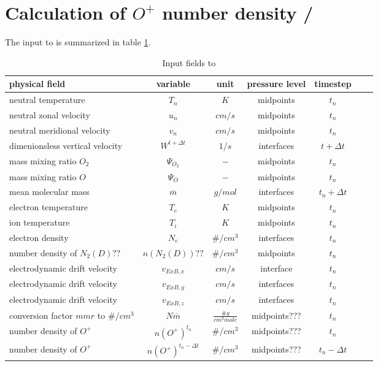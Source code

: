 %
\section{Calculation of $O^+$ number density / }\label{cap:oplus}
%
The input to  is summarized in table
\ref{tab:input_oplus}.
%
\begin{table}[tb]
\begin{tabular}{|p{3.5cm} ||c|c|c|c|c|c|} \hline
physical field               & variable        & unit&pressure
level& timestep
\\ \hline \hline
%
neutral temperature &       $T_n$              & $K$   &  midpoints & $t_n$\\
neutral zonal velocity&     $u_n$     & $cm/s$   &  midpoints & $t_n$\\
neutral meridional velocity & $v_n$   & $cm/s$   &  midpoints & $t_n$\\
dimenionsless vertical velocity& $W^{t+\Delta t}$& $1/s$   & interfaces& $t+\Delta t$ \\
mass mixing ratio $O_2$&       {$\Psi_{O_2}$}     & $-$   & midpoints  & $t_n$\\
mass mixing ratio $O$&       {$\Psi_{O}$}     & $-$   &  midpoints & $t_n$\\
mean molecular mass&       {$\overline{m}$}     & $g/mol$   & interfaces  &$t_n + \Delta t$ \\
electron temperature &       $T_e$              & $K$   &  midpoints & $t_n$\\
ion temperature &       $T_i$              & $K$   &  midpoints & $t_n$\\
electron density &       $N_e$              & $\#/cm^3$   &  interfaces & $t_n$\\
number density of $N_2(D)??$ &       $n(N_2(D))??$              & $\#/cm^3$   &  midpoints & $t_n$\\
electrodynamic drift velocity &       $v_{ExB,x}$              & $cm/s$   &  interface & $t_n$\\
electrodynamic drift velocity &       $v_{ExB,y}$              & $cm/s$   &  interfaces & $t_n$\\
electrodynamic drift velocity &       $v_{ExB,z}$              & $cm/s$   &  interfaces & $t_n$\\
conversion factor $mmr$ to $\#/cm^3$ &       $N\overline{m}$              & $\frac{\# g}{cm^3 mole}$   &  midpoints??? & $t_n$\\
number density of $O^+$ &       $n(O^+)^{t_n}$              & $\#/cm^3$   &  midpoints??? & $t_n$\\
number density of $O^+$ &       $n(O^+)^{t_n- \Delta t}$ & $\#/cm^3$
&  midpoints??? & $t_n- \Delta t$
  \\ \hline
\end{tabular}
\caption{Input fields to }
\label{tab:input_oplus}
\end{table}
